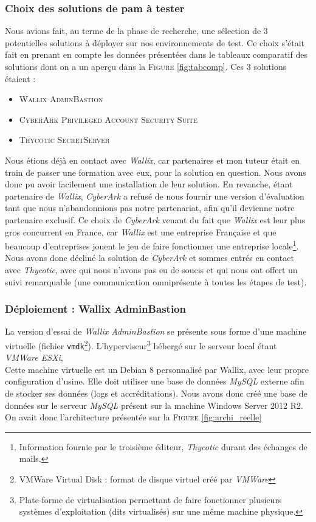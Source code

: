 \subsubsection{Choix des solutions de \gls{pam} à tester}
\label{par:choixsol}

Nous avions fait, au terme de la phase de recherche, une sélection de 3 potentielles solutions à déployer sur nos environnements de test. Ce choix s'était fait en prenant en compte les données présentées dans le tableaux comparatif des solutions dont on a un aperçu dans la \textsc{Figure} \ref{fig:tabcomp}. Ces 3 solutions étaient :
\begin{itemize}
	\item \textsc{Wallix AdminBastion}
	\item \textsc{CyberArk Privileged Account Security Suite}
	\item \textsc{Thycotic SecretServer}
\end{itemize}

Nous étions déjà en contact avec \emph{Wallix}, car partenaires et mon tuteur était en train de passer une formation avec eux, pour la solution en question. Nous avons donc pu avoir facilement une installation de leur solution. En revanche, étant partenaire de \emph{Wallix}, \emph{CyberArk} a refusé de nous fournir une version d'évaluation tant que nous n'abandonnions pas notre partenariat, afin qu'il devienne notre partenaire exclusif. Ce choix de \emph{CyberArk} venant du fait que \emph{Wallix} est leur plus gros concurrent en France, car \emph{Wallix} est une entreprise Française et que beaucoup d'entreprises jouent le jeu de faire fonctionner une entreprise locale\footnote{Information fournie par le troisième éditeur, \emph{Thycotic} durant des échanges de mails.}. Nous avons donc décliné la solution de \emph{CyberArk} et sommes entrés en contact avec \emph{Thycotic}, avec qui nous n'avons pas eu de soucis et qui nous ont offert un suivi remarquable (une communication omniprésente à toutes les étapes de test).

\subsubsection{Déploiement : Wallix AdminBastion}
\label{par:depwallix}

La version d'essai de \emph{Wallix AdminBastion} se présente sous forme d'une machine virtuelle (fichier \texttt{vmdk}\footnote{VMWare Virtual Disk : format de disque virtuel créé par \emph{VMWare}}). L'hyperviseur\footnote{Plate-forme de virtualisation permettant de faire fonctionner plusieurs systèmes d'exploitation (dits virtualisés) sur une même machine physique.} hébergé sur le serveur local étant \emph{VMWare ESXi}, \\
Cette machine virtuelle est un Debian 8 personnalisé par Wallix, avec leur propre configuration d'usine. Elle doit utiliser une base de données \emph{MySQL} externe afin de stocker ses données (logs et accréditations). Nous avons donc créé une base de données sur le serveur \emph{MySQL} présent sur la machine Windows Server 2012 R2. On avait donc l'architecture présentée sur la \textsc{Figure} \ref{fig:archi_reelle}

